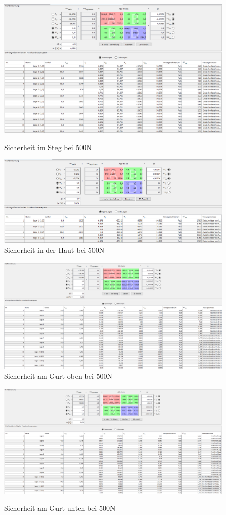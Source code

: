 \begin{figure}[h]
 \centering
 \includegraphics[width=1\textwidth]{Bilder/sicher1}
 \label{sicher-steg}
 \caption{Sicherheit im Steg bei 500N}
\end{figure}
\begin{figure}[h]
\centering
\includegraphics[width=1\textwidth]{Bilder/sicher2}
\caption{Sicherheit in der Haut bei 500N}
\end{figure}
\begin{figure}[h]
\centering
\includegraphics[width=1\textwidth]{Bilder/sicher3}
\caption{Sicherheit am Gurt oben bei 500N}
\end{figure}
\begin{figure}[h]
\centering
\includegraphics[width=1\textwidth]{Bilder/sicher4}
\label{sicher-gurt}
\caption{Sicherheit am Gurt unten bei 500N}
\end{figure}

